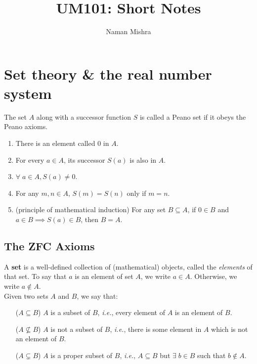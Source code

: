 \documentclass[12pt]{article}
\title{UM101: Short Notes}
\author{Naman Mishra}
\begin{document}
\maketitle
\tableofcontents

\section{Set theory \& the real number system}

\begin{defn} \label{defn:peano set}
    The set $A$ along with a successor function $S$ is called a Peano set if it obeys the Peano axioms.
    \begin{enumerate}[label=(P\arabic*)]
        \item \label{peano:zero}
            There is an element called 0 in $A$.
        \item \label{peano:succ}
            For every $a \in A$, its successor $S(a)$ is also in $A$.
        \item \label{peano:not succ}
            $\forall \; a \in A, S(a) \neq 0$.
        \item \label{peano:injective}
            For any $m, n \in A$, $S(m) = S(n)$ only if $m = n$.
        \item \label{peano:induction}
            (principle of mathematical induction) For any set $B \subseteq A$, if $0 \in B$ and $a \in B \implies S(a) \in B$, then $B = A$.
    \end{enumerate}
\end{defn}

\subsection{The ZFC Axioms}

\begin{defn} \label{defn:set}
    A \textbf{set} is a well-defined collection of (mathematical) objects, called the \emph{elements} of that set. To say that $a$ is an element of set $A$, we write $a \in A$. Otherwise, we write $a \notin A$. \\
    Given two sets $A$ and $B$, we say that:
    \begin{enumerate}
        \item[($A \subseteq B$)] $A$ is a subset of $B$, \textit{i.e.}, every element of $A$ is an element of $B$.
        \item[($A \not\subseteq B$)] $A$ is not a subset of $B$, \textit{i.e.}, there is some element in $A$ which is not an element of $B$.
        \item[($A \subsetneq B$)] $A$ is a proper subset of $B$, \textit{i.e.}, $A \subseteq B$ but $\exists\; b \in B$ such that $b \notin A$.
    \end{enumerate}
\end{defn}
\end{document}
